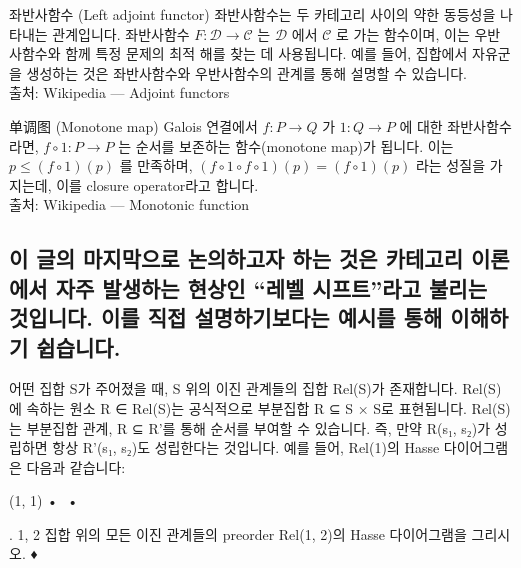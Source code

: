 \documentclass[11pt, a4paper, twoside, openany]{book}
\begin{document}
\begin{deepresearch}{좌반사함수 (Left adjoint functor)}
좌반사함수는 두 카테고리 사이의 약한 동등성을 나타내는 관계입니다.  좌반사함수 $F : {\mathcal{D}} \to {\mathcal{C}}$ 는  ${\mathcal{D}}$ 에서 ${\mathcal{C}}$ 로 가는 함수이며, 이는 우반사함수와 함께 특정 문제의 최적 해를 찾는 데 사용됩니다. 예를 들어, 집합에서 자유군을 생성하는 것은 좌반사함수와 우반사함수의 관계를 통해 설명할 수 있습니다.
\\[4pt]{\footnotesize\color{ctgray} 출처: Wikipedia — Adjoint functors}
\end{deepresearch}

\begin{deepresearch}{单调图 (Monotone map) }
Galois 연결에서 $f : P \to Q$ 가 $1 : Q \to P$ 에 대한 좌반사함수라면,  $f \circ 1 : P \to P$ 는 순서를 보존하는 함수(monotone map)가 됩니다. 이는 $p \le (f \circ 1)(p)$ 를 만족하며, $(f \circ 1 \circ f \circ 1)(p) = (f \circ 1)(p)$ 라는 성질을 가지는데, 이를 closure operator\hspace{0pt}라고 합니다.
\\[4pt]{\footnotesize\color{ctgray} 출처: Wikipedia — Monotonic function}
\end{deepresearch}


\subsection{이 글의 마지막으로 논의하고자 하는 것은 카테고리 이론에서 자주 발생하는 현상인 “레벨 시프트”라고 불리는 것입니다. 이를 직접 설명하기보다는 예시를 통해 이해하기 쉽습니다.}
\label{sec:1-4-5}

어떤 집합 S\hspace{0pt}가 주어졌을 때, S 위의 이진 관계들의 집합 Rel(S)가 존재합니다.  Rel(S)에 속하는 원소 R ∈ Rel(S)는 공식적으로 부분집합 R ⊆ S × S\hspace{0pt}로 표현됩니다. Rel(S)는 부분집합 관계, R ⊆ R'를 통해 순서를 부여할 수 있습니다. 즉, 만약 R(s₁, s₂)가 성립하면 항상 R'(s₁, s₂)도 성립한다는 것입니다. 예를 들어, Rel({1})의 Hasse 다이어그램은 다음과 같습니다:

\par\medskip
{(1, 1)}
•
 •

\par\medskip
\begin{exercisebox}[Exercise 1.124]
.
{1, 2} 집합 위의 모든 이진 관계들의 preorder Rel({1, 2})의 Hasse 다이어그램을 그리시오.
♦
\end{exercisebox}
\end{document}
